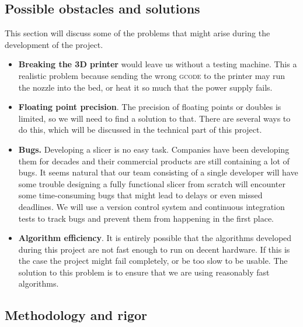 \subsection{Possible obstacles and solutions}
This section will discuss some of the problems that might arise during the development of the project.

\begin{itemize}
    \item \textbf{Breaking the 3D printer} would leave us without a testing machine. This a realistic problem because sending the wrong \textsc{gcode} to the printer may run the nozzle into the bed, or heat it so much that the power supply fails.
    \item \textbf{Floating point precision}. The precision of floating points or doubles is limited, so we will need to find a solution to that. There are several ways to do this, which will be discussed in the technical part of this project.
    \item \textbf{Bugs.} Developing a slicer is no easy task. Companies have been developing them for decades and their commercial products are still containing a lot of bugs. It seems natural that our team consisting of a single developer will have some trouble designing a fully functional slicer from scratch will encounter some time-consuming bugs that might lead to delays or even missed deadlines. We will use a version control system and continuous integration tests to track bugs and prevent them from happening in the first place.
    \item \textbf{Algorithm efficiency}. It is entirely possible that the algorithms developed during this project are not fast enough to run on decent hardware. If this is the case the project might fail completely, or be too slow to be usable. The solution to this problem is to ensure that we are using reasonably fast algorithms.
\end{itemize}

\subsection{Methodology and rigor}

